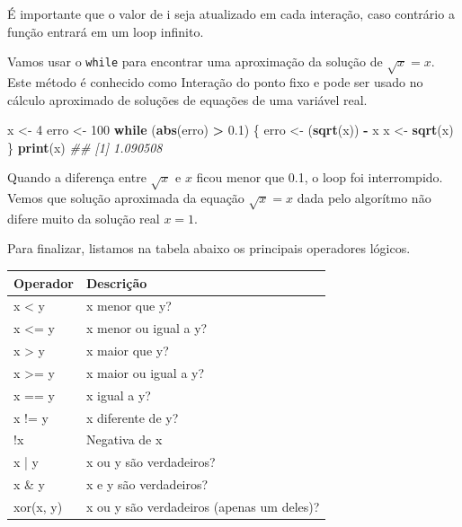 \documentclass[
]{book}
\newenvironment{Shaded}{\begin{snugshade}}{\end{snugshade}}
\newcommand{\CommentTok}[1]{\textcolor[rgb]{0.56,0.35,0.01}{\textit{#1}}}
\newcommand{\ControlFlowTok}[1]{\textcolor[rgb]{0.13,0.29,0.53}{\textbf{#1}}}
\newcommand{\DecValTok}[1]{\textcolor[rgb]{0.00,0.00,0.81}{#1}}
\newcommand{\FloatTok}[1]{\textcolor[rgb]{0.00,0.00,0.81}{#1}}
\newcommand{\KeywordTok}[1]{\textcolor[rgb]{0.13,0.29,0.53}{\textbf{#1}}}
\newcommand{\NormalTok}[1]{#1}
\newcommand{\OperatorTok}[1]{\textcolor[rgb]{0.81,0.36,0.00}{\textbf{#1}}}
\newcommand{\StringTok}[1]{\textcolor[rgb]{0.31,0.60,0.02}{#1}}
\begin{document}
É importante que o valor de i seja atualizado em cada interação, caso contrário a função entrará em um loop infinito.

Vamos usar o \texttt{while} para encontrar uma aproximação da solução de \(\sqrt{x} = x\). Este método é conhecido como Interação do ponto fixo e pode ser usado no cálculo aproximado de soluções de equações de uma variável real.

\begin{Shaded}
\begin{Highlighting}[]

\NormalTok{x <-}\StringTok{ }\DecValTok{4}
\NormalTok{erro <-}\StringTok{ }\DecValTok{100}
\ControlFlowTok{while}\NormalTok{ (}\KeywordTok{abs}\NormalTok{(erro) }\OperatorTok{>}\StringTok{ }\FloatTok{0.1}\NormalTok{) \{}
\NormalTok{  erro <-}\StringTok{ }\NormalTok{(}\KeywordTok{sqrt}\NormalTok{(x)) }\OperatorTok{-}\StringTok{ }\NormalTok{x}
\NormalTok{  x <-}\StringTok{ }\KeywordTok{sqrt}\NormalTok{(x)}
\NormalTok{\}}
\KeywordTok{print}\NormalTok{(x)}
\CommentTok{## [1] 1.090508}
\end{Highlighting}
\end{Shaded}

Quando a diferença entre \(\sqrt{x}\) e \(x\) ficou menor que 0.1, o loop foi interrompido.
Vemos que solução aproximada da equação \(\sqrt{x} = x\) dada pelo algorítmo não difere muito da solução real \(x=1\).

Para finalizar, listamos na tabela abaixo os principais operadores lógicos.

\begin{tabular}{l|l}
\hline
Operador & Descrição\\
\hline
x < y & x menor que y?\\
\hline
x <= y & x menor ou igual a y?\\
\hline
x > y & x maior que y?\\
\hline
x >= y & x maior ou igual a y?\\
\hline
x == y & x igual a y?\\
\hline
x != y & x diferente de y?\\
\hline
!x & Negativa de x\\
\hline
x | y & x ou y são verdadeiros?\\
\hline
x \& y & x e y são verdadeiros?\\
\hline
xor(x, y) & x ou y são verdadeiros (apenas um deles)?\\
\hline
\end{tabular}
\end{document}
